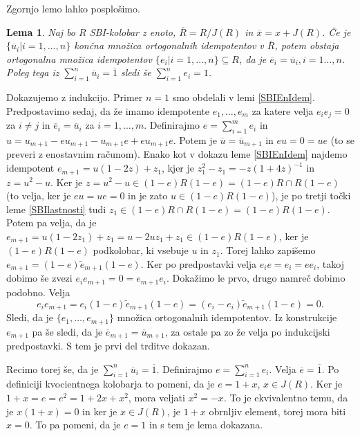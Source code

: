 \documentclass[a4paper, 12pt]{amsart}
\theoremstyle{definition} %
\theoremstyle{plain} %
\newtheorem{lema}[definicija]{Lema}
\begin{document}
Zgornjo lemo lahko posplošimo.

\begin{lema}
\label{SBInIdem}
Naj bo $R$ SBI-kolobar z enoto, $\overline{R} = R/J(R)$ in $\overline{x} = x + J(R)$. Če je $\{\overline{u}_i|i=1,\dots,n\}$ končna množica ortogonalnih idempotentov v $\overline{R}$, potem obstaja ortogonalna množica idempotentov $\{e_i|i=1,\dots,n\} \subseteq R$, da je $\overline{e}_i = \overline{u}_i, i =1\dots,n$. Poleg tega iz $\sum_{i=1}^n \overline{u}_i = \overline{1}$ sledi še $\sum_{i=1}^n e_i =1$. 
\end{lema}

\proof
Dokazujemo z indukcijo. Primer $n=1$ smo obdelali v lemi \ref{SBIEnIdem}. Predpostavimo sedaj, da že imamo idempotente $e_1,\dots,e_m$ za katere velja $e_i e_j = 0$ za $ i \neq j$ in $\overline{e}_i = \overline{u}_i$ za $i=1,\dots,m$. Definirajmo $e=\sum_{i=1}^m e_i$ in $u = u_{m+1} - eu_{m+1} - u_{m+1}e + eu_{m+1}e$. Potem je $\overline{u} = \overline{u}_{m+1}$ in $eu = 0 = ue$ (to se preveri z enostavnim računom). Enako kot v dokazu leme  \ref{SBIEnIdem} najdemo idempotent $e_{m+1} = u(1-2z) + z_1$, kjer je $z_1^2 - z_1 = -z(1+4z)^{-1}$ in $z = u^2 - u$. Ker je $z=u^2 - u\in (1-e) R(1-e) = (1-e)R\cap R(1-e)$ (to velja, ker je $eu=ue=0$ in je zato $u\in (1-e)R(1-e)$), je po tretji točki leme \ref{SBIlastnosti} tudi $z_1 \in (1-e) R\cap R(1-e) = (1-e)R(1-e)$. Potem pa velja, da je $e_{m+1} = u(1-2z_1) + z_1 = u - 2 uz_1 + z_1\in (1-e)R(1-e)$, ker je $(1-e)R(1-e)$ podkolobar, ki vsebuje $u$ in $z_1$. Torej lahko zapišemo $e_{m+1} = (1-e)\tilde{e}_{m+1}(1-e)$. Ker po predpostavki velja $e_i e =  e_i = e e_i$, takoj dobimo še zvezi $e_i e_{m+1} = 0 =e_{m+1} e_i$. Dokažimo le prvo, drugo namreč dobimo podobno. Velja
$$
e_i e_{m+1} = e_i (1-e) \tilde{e}_{m+1} (1-e) = (e_i - e_i) \tilde{e}_{m+1}(1-e) = 0.
$$
Sledi, da je $\{e_1, \dots, e_{m+1}\}$ množica ortogonalnih idempotentov. Iz konstrukcije $e_{m+1}$ pa še sledi, da je $\overline{e}_{m+1} =  \overline{u}_{m+1}$, za ostale pa zo že velja po indukcijski predpostavki. S tem je prvi del trditve dokazan. 

Recimo torej še, da je $\sum_{i=1}^n \overline{u}_i = \overline{1}$. Definirajmo $e= \sum_{i=1}^n e_i$. Velja $\overline{e} = \overline{1}$. Po definiciji kvocientnega kolobarja to pomeni, da je $e = 1+x$, $x\in J(R)$. Ker je $1+x=e=e^2 = 1+ 2x + x^2$, mora veljati $x^2 = -x$. To je ekvivalentno temu, da je 
$x(1+x) = 0$ in ker je $x\in J(R)$, je $1+x$ obrnljiv element, torej mora biti $x=0$. To pa pomeni, da je $e=1$ in s tem je lema dokazana.
\endproof
\end{document}
